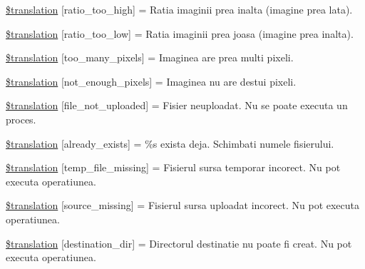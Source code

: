 \begin{DoxyCompactItemize}
\hyperlink{class_8upload_8ro___r_o_8php_a23396f6ce7f31e5e5f1b57580621d982}{\$translation} \mbox{[}\textquotesingle{}ratio\+\_\+too\+\_\+high\textquotesingle{}\mbox{]} = \textquotesingle{}Ratia imaginii prea inalta (imagine prea lata).\textquotesingle{}
\item 
\hyperlink{class_8upload_8ro___r_o_8php_ac533b9a479f056b0b8623e4268f068c2}{\$translation} \mbox{[}\textquotesingle{}ratio\+\_\+too\+\_\+low\textquotesingle{}\mbox{]} = \textquotesingle{}Ratia imaginii prea joasa (imagine prea inalta).\textquotesingle{}
\item 
\hyperlink{class_8upload_8ro___r_o_8php_aa4051ef64e94a3f8295c63cf85544016}{\$translation} \mbox{[}\textquotesingle{}too\+\_\+many\+\_\+pixels\textquotesingle{}\mbox{]} = \textquotesingle{}Imaginea are prea multi pixeli.\textquotesingle{}
\item 
\hyperlink{class_8upload_8ro___r_o_8php_a1fe342c27ce61f4ff4e0120ba647033e}{\$translation} \mbox{[}\textquotesingle{}not\+\_\+enough\+\_\+pixels\textquotesingle{}\mbox{]} = \textquotesingle{}Imaginea nu are destui pixeli.\textquotesingle{}
\item 
\hyperlink{class_8upload_8ro___r_o_8php_a4ce76e7be0b3a03c2b47f6d70c21832e}{\$translation} \mbox{[}\textquotesingle{}file\+\_\+not\+\_\+uploaded\textquotesingle{}\mbox{]} = \textquotesingle{}Fisier neuploadat. Nu se poate executa un proces.\textquotesingle{}
\item 
\hyperlink{class_8upload_8ro___r_o_8php_afd84e910217f04139f567c41e292afa5}{\$translation} \mbox{[}\textquotesingle{}already\+\_\+exists\textquotesingle{}\mbox{]} = \textquotesingle{}\%s exista deja. Schimbati numele fisierului.\textquotesingle{}
\item 
\hyperlink{class_8upload_8ro___r_o_8php_ab0fa87a88aba2624004581eed0633325}{\$translation} \mbox{[}\textquotesingle{}temp\+\_\+file\+\_\+missing\textquotesingle{}\mbox{]} = \textquotesingle{}Fisierul sursa temporar incorect. Nu pot executa operatiunea.\textquotesingle{}
\item 
\hyperlink{class_8upload_8ro___r_o_8php_aceaaf7355acaaf10f0ae60378d03c468}{\$translation} \mbox{[}\textquotesingle{}source\+\_\+missing\textquotesingle{}\mbox{]} = \textquotesingle{}Fisierul sursa uploadat incorect. Nu pot executa operatiunea.\textquotesingle{}
\item 
\hyperlink{class_8upload_8ro___r_o_8php_aff2427c72a2598aefa6d58df1dd18b08}{\$translation} \mbox{[}\textquotesingle{}destination\+\_\+dir\textquotesingle{}\mbox{]} = \textquotesingle{}Directorul destinatie nu poate fi creat. Nu pot executa operatiunea.\textquotesingle{}

\end{DoxyCompactItemize}
